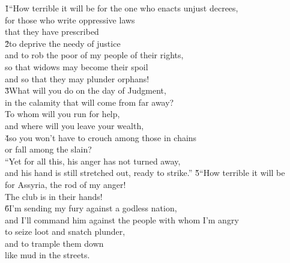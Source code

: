 \begin{poetry}
\poeml {}
\v{1}``How terrible it will be for the one who enacts unjust decrees, \\
\poemll    for those who write oppressive laws \\
\poemll    that they have prescribed \\
\poeml \v{2}to deprive the needy of justice \\
\poemll    and to rob the poor of my people of their rights, \\
\poeml so that widows may become their spoil \\
\poemll    and so that they may plunder orphans! \\
\poeml \v{3}What will you do on the day of Judgment, \\
\poemll    in the calamity that will come from far away? \\
\poeml To whom will you run for help, \\
\poemll    and where will you leave your wealth, \\
\poeml \v{4}so you won't have to crouch among those in chains \\
\poemll    or fall among the slain? \\
\poeml ``Yet for all this, his anger has not turned away, \\
\poemll    and his hand is still stretched out, ready to strike.''
\poeml \v{5}``How terrible it will be \\
\poemll    for Assyria, the rod of my anger! \\
\poemlll       The club is in their hands! \\
\poeml \v{6}I'm sending my fury against a godless nation, \\
\poemll    and I'll command him against the people with whom I'm angry \\
\poeml to seize loot and snatch plunder, \\
\poemll    and to trample them down \\
\poemlll       like mud in the streets. \\

\end{poetry}
